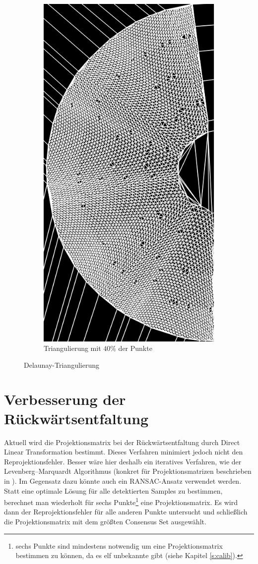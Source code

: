 \begin{figure}[!htb]
\begin{subfigure}{.9\textwidth}
		\includegraphics[angle=-90, width=.8\textwidth]{images/delaunay2.png}
		\caption{Triangulierung mit $40\%$ der Punkte}
	\end{subfigure}
	\caption{Delaunay-Triangulierung}
	\label{fig:delaunayTriag}
\end{figure}


\section{Verbesserung der Rückwärtsentfaltung}
Aktuell wird die Projektionsmatrix bei der Rückwärtsentfaltung durch Direct Linear Transformation bestimmt. Dieses Verfahren minimiert jedoch nicht den Reprojektionsfehler. Besser wäre hier deshalb ein iteratives Verfahren, wie der Levenberg–Marquardt Algorithmus (konkret für Projektionsmatrizen beschrieben in \cite{Hartley2000}).
Im Gegensatz dazu könnte auch ein RANSAC-Ansatz verwendet werden. Statt eine optimale Lösung für alle detektierten Samples zu bestimmen, berechnet man wiederholt für sechs Punkte\footnote{sechs Punkte sind mindestens notwendig um eine Projektionsmatrix bestimmen zu können, da es elf unbekannte gibt (siehe Kapitel \ref{s:calib}).} eine Projektionsmatrix. Es wird dann der Reprojektionsfehler für alle anderen Punkte untersucht und schließlich die Projektionsmatrix mit dem größten Consensus Set ausgewählt.


